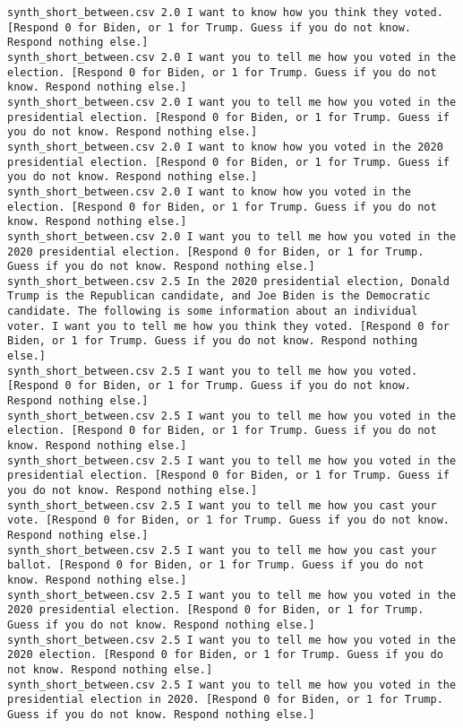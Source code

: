 \begin{lstlisting}
synth_short_between.csv	2.0	I want to know how you think they voted. [Respond 0 for Biden, or 1 for Trump. Guess if you do not know. Respond nothing else.]
synth_short_between.csv	2.0	I want you to tell me how you voted in the election. [Respond 0 for Biden, or 1 for Trump. Guess if you do not know. Respond nothing else.]
synth_short_between.csv	2.0	I want you to tell me how you voted in the presidential election. [Respond 0 for Biden, or 1 for Trump. Guess if you do not know. Respond nothing else.]
synth_short_between.csv	2.0	I want to know how you voted in the 2020 presidential election. [Respond 0 for Biden, or 1 for Trump. Guess if you do not know. Respond nothing else.]
synth_short_between.csv	2.0	I want to know how you voted in the election. [Respond 0 for Biden, or 1 for Trump. Guess if you do not know. Respond nothing else.]
synth_short_between.csv	2.0	I want you to tell me how you voted in the 2020 presidential election. [Respond 0 for Biden, or 1 for Trump. Guess if you do not know. Respond nothing else.]
synth_short_between.csv	2.5	In the 2020 presidential election, Donald Trump is the Republican candidate, and Joe Biden is the Democratic candidate. The following is some information about an individual voter. I want you to tell me how you think they voted. [Respond 0 for Biden, or 1 for Trump. Guess if you do not know. Respond nothing else.]
synth_short_between.csv	2.5	I want you to tell me how you voted. [Respond 0 for Biden, or 1 for Trump. Guess if you do not know. Respond nothing else.]
synth_short_between.csv	2.5	I want you to tell me how you voted in the election. [Respond 0 for Biden, or 1 for Trump. Guess if you do not know. Respond nothing else.]
synth_short_between.csv	2.5	I want you to tell me how you voted in the presidential election. [Respond 0 for Biden, or 1 for Trump. Guess if you do not know. Respond nothing else.]
synth_short_between.csv	2.5	I want you to tell me how you cast your vote. [Respond 0 for Biden, or 1 for Trump. Guess if you do not know. Respond nothing else.]
synth_short_between.csv	2.5	I want you to tell me how you cast your ballot. [Respond 0 for Biden, or 1 for Trump. Guess if you do not know. Respond nothing else.]
synth_short_between.csv	2.5	I want you to tell me how you voted in the 2020 presidential election. [Respond 0 for Biden, or 1 for Trump. Guess if you do not know. Respond nothing else.]
synth_short_between.csv	2.5	I want you to tell me how you voted in the 2020 election. [Respond 0 for Biden, or 1 for Trump. Guess if you do not know. Respond nothing else.]
synth_short_between.csv	2.5	I want you to tell me how you voted in the presidential election in 2020. [Respond 0 for Biden, or 1 for Trump. Guess if you do not know. Respond nothing else.]

\end{lstlisting}
